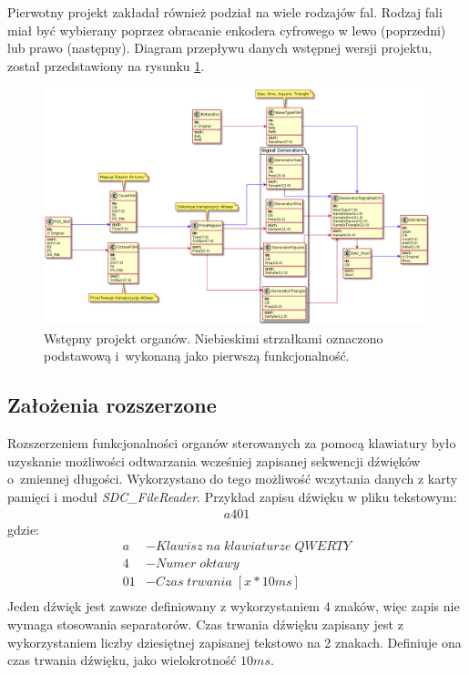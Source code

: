 \documentclass[a4paper,12pt]{article}
\begin{document}


Pierwotny projekt zakładał również podział na wiele rodzajów fal. Rodzaj fali miał być wybierany poprzez obracanie enkodera cyfrowego w lewo (poprzedni) lub prawo (następny). Diagram przepływu danych wstępnej wersji projektu, został przedstawiony na rysunku \ref{base}.

\begin{figure}[h]
  \centering
  \includegraphics[width=\linewidth]{./diagram/out/flow_chart}
  \caption{Wstępny projekt organów. Niebieskimi strzałkami oznaczono podstawową i~wykonaną jako pierwszą funkcjonalność. }
  \label{base}
\end{figure}



\subsection{Założenia rozszerzone}

Rozszerzeniem funkcjonalności organów sterowanych za pomocą klawiatury było uzyskanie możliwości odtwarzania wcześniej zapisanej sekwencji dźwięków o~zmiennej długości. Wykorzystano do tego możliwość wczytania danych z karty pamięci i moduł \textit{SDC\_FileReader}\cite{web:sdcfilereader}.
Przykład zapisu dźwięku w pliku tekstowym:
\begin{align*}
  a401
\end{align*}
gdzie:
\begin{align*}
  a                & - Klawisz\;na\;klawiaturze\;QWERTY \\
  4                & - Numer\;oktawy                   \\
  01 & - Czas\;trwania\;[x*10ms]           \\
\end{align*}
Jeden dźwięk jest zawsze definiowany z wykorzystaniem 4 znaków, więc zapis nie wymaga stosowania separatorów. Czas trwania dźwięku zapisany jest z wykorzystaniem liczby dziesiętnej zapisanej tekstowo na 2 znakach. Definiuje ona czas trwania dźwięku, jako wielokrotność $10ms$.
\end{document}
